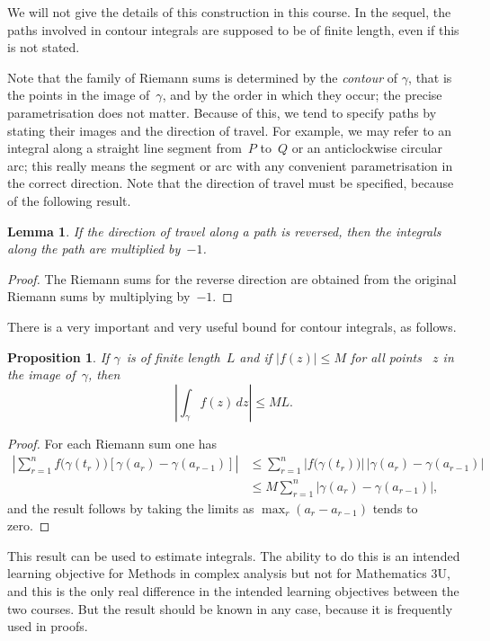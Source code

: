 \documentclass{amsproc}
\newtheorem{lemma}[theorem]{Lemma}
\newtheorem{proposition}[theorem]{Proposition}
\theoremstyle{definition}
\theoremstyle{remark}
\numberwithin{equation}{section}
\begin{document}
We will not give the details of this construction in this course. In the sequel, the paths involved in contour integrals are supposed to be of finite length, even if this is not stated.

Note that the family of Riemann sums is determined by the \emph{contour} of $ \gamma $, that is the points in the image of~$ \gamma $, and by the order in which they occur;
the precise parametrisation does not matter.
Because of this, we tend to specify paths by stating their images and the direction of travel. For example, we may refer to an integral along a straight line segment
from~$ P $ to~$ Q $ or an anticlockwise circular arc; this really means the segment or arc with any convenient parametrisation in the correct direction. Note that the direction
of travel must be specified, because of the following result.

\begin{lemma} \label{CMP6.2}
If the direction of travel along a path is reversed, then the integrals along the path are multiplied by~$ -1 $.
\end{lemma}

\begin{proof}
The Riemann sums for the reverse direction are obtained from the original Riemann sums by multiplying by~$ -1 $.
\end{proof}

There is a very important and very useful bound for contour integrals, as follows.

\begin{proposition} \label{CMT6.3}
If $ \gamma $~is of finite length~$ L $ and if $ |f(z)| \leq M $ for all points ~$ z $ in the image of~$ \gamma $, then
$$
\left|\int_\gamma f(z)\,dz\right| \leq ML.
$$
\end{proposition}

\begin{proof}
For each Riemann sum one has
\begin{align*}
\left|\sum_{r = 1}^n f\bigl(\gamma(t_r)\bigr)[\gamma(a_r) - \gamma(a_{r - 1})]\right|
&\leq \sum_{r = 1}^n |f\bigl(\gamma(t_r)\bigr)|\,|\gamma(a_r) - \gamma(a_{r - 1})| \\
&\leq M\sum_{r = 1}^n |\gamma(a_r) - \gamma(a_{r - 1})|,
\end{align*}
and the result follows by taking the limits as $ \max_r(a_r - a_{r - 1}) $ tends to zero.
\end{proof}

This result can be used to estimate integrals. The ability to do this is an intended learning objective for Methods in complex analysis but not for Mathematics 3U, and this
is the only real difference in the intended learning objectives between the two courses. But the result should be known in any case, because it is frequently used in proofs.
\end{document}
